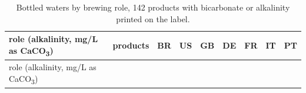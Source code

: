 \documentclass[
  a4paper,
]{article}
\author{}
\date{}
\begin{document}
\begin{longtable}[]{@{}
  >{\raggedright\arraybackslash}p{}
  >{\raggedright\arraybackslash}p{}
  >{\raggedright\arraybackslash}p{}
  >{\raggedright\arraybackslash}p{}
  >{\raggedright\arraybackslash}p{}
  >{\raggedright\arraybackslash}p{}
  >{\raggedright\arraybackslash}p{}
  >{\raggedright\arraybackslash}p{}
  >{\raggedright\arraybackslash}p{}@{}}
\caption{Bottled waters by brewing role, 142 products with bicarbonate
or alkalinity printed on the label.}\label{tbl-bottled}\tabularnewline
\toprule\noalign{}
\begin{minipage}[b]{\linewidth}\raggedright
role (alkalinity, mg/L as CaCO\textsubscript{3})
\end{minipage} & \begin{minipage}[b]{\linewidth}\raggedright
products
\end{minipage} & \begin{minipage}[b]{\linewidth}\raggedright
BR
\end{minipage} & \begin{minipage}[b]{\linewidth}\raggedright
US
\end{minipage} & \begin{minipage}[b]{\linewidth}\raggedright
GB
\end{minipage} & \begin{minipage}[b]{\linewidth}\raggedright
DE
\end{minipage} & \begin{minipage}[b]{\linewidth}\raggedright
FR
\end{minipage} & \begin{minipage}[b]{\linewidth}\raggedright
IT
\end{minipage} & \begin{minipage}[b]{\linewidth}\raggedright
PT
\end{minipage} \\
\midrule\noalign{}
\endfirsthead
\toprule\noalign{}
\begin{minipage}[b]{\linewidth}\raggedright
role (alkalinity, mg/L as CaCO\textsubscript{3})
\end{minipage} & \begin{minipage}[b]{\linewidth}\raggedright

\end{minipage}
\end{longtable}
\end{document}
